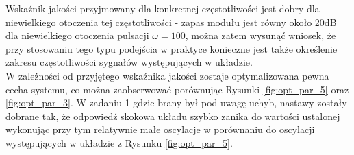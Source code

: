 \documentclass[a4paper,11pt]{article}
\begin{document}
Wskaźnik jakości przyjmowany dla konkretnej częstotliwości jest dobry dla niewielkiego otoczenia tej częstotliwości - zapas modułu jest równy około 20dB dla niewielkiego otoczenia pulsacji \( \omega = 100 \), można zatem wysunąć wniosek, że przy stosowaniu tego typu podejścia w praktyce konieczne jest także określenie zakresu częstotliwości sygnałów występujących w układzie. \\

W zależności od przyjętego wskaźnika jakości zostaje optymalizowana pewna cecha systemu, co można zaobserwować porównując Rysunki \ref{fig:opt_par_5} oraz \ref{fig:opt_par_3}. W zadaniu 1 gdzie brany był pod uwagę uchyb, nastawy zostały dobrane tak, że odpowiedź skokowa układu szybko zanika do wartości ustalonej wykonując przy tym relatywnie małe oscylacje w porównaniu do oscylacji występujących w układzie z Rysunku \ref{fig:opt_par_5}. 
\end{document}
